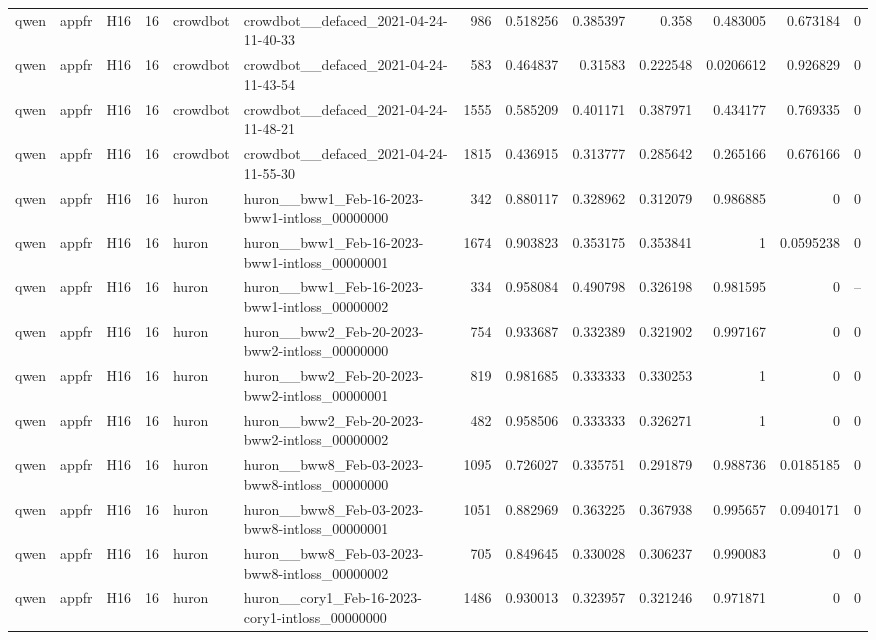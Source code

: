 \begin{longtable}{lllrllrrrrrrr}
qwen & appfr & H16 & 16 & crowdbot & crowdbot\_\_defaced\_2021-04-24-11-40-33 & 986 & 0.518256 & 0.385397 & 0.358 & 0.483005 & 0.673184 & 0 \\
qwen & appfr & H16 & 16 & crowdbot & crowdbot\_\_defaced\_2021-04-24-11-43-54 & 583 & 0.464837 & 0.31583 & 0.222548 & 0.0206612 & 0.926829 & 0 \\
qwen & appfr & H16 & 16 & crowdbot & crowdbot\_\_defaced\_2021-04-24-11-48-21 & 1555 & 0.585209 & 0.401171 & 0.387971 & 0.434177 & 0.769335 & 0 \\
qwen & appfr & H16 & 16 & crowdbot & crowdbot\_\_defaced\_2021-04-24-11-55-30 & 1815 & 0.436915 & 0.313777 & 0.285642 & 0.265166 & 0.676166 & 0 \\
qwen & appfr & H16 & 16 & huron & huron\_\_bww1\_Feb-16-2023-bww1-intloss\_00000000 & 342 & 0.880117 & 0.328962 & 0.312079 & 0.986885 & 0 & 0 \\
qwen & appfr & H16 & 16 & huron & huron\_\_bww1\_Feb-16-2023-bww1-intloss\_00000001 & 1674 & 0.903823 & 0.353175 & 0.353841 & 1 & 0.0595238 & 0 \\
qwen & appfr & H16 & 16 & huron & huron\_\_bww1\_Feb-16-2023-bww1-intloss\_00000002 & 334 & 0.958084 & 0.490798 & 0.326198 & 0.981595 & 0 & -- \\
qwen & appfr & H16 & 16 & huron & huron\_\_bww2\_Feb-20-2023-bww2-intloss\_00000000 & 754 & 0.933687 & 0.332389 & 0.321902 & 0.997167 & 0 & 0 \\
qwen & appfr & H16 & 16 & huron & huron\_\_bww2\_Feb-20-2023-bww2-intloss\_00000001 & 819 & 0.981685 & 0.333333 & 0.330253 & 1 & 0 & 0 \\
qwen & appfr & H16 & 16 & huron & huron\_\_bww2\_Feb-20-2023-bww2-intloss\_00000002 & 482 & 0.958506 & 0.333333 & 0.326271 & 1 & 0 & 0 \\
qwen & appfr & H16 & 16 & huron & huron\_\_bww8\_Feb-03-2023-bww8-intloss\_00000000 & 1095 & 0.726027 & 0.335751 & 0.291879 & 0.988736 & 0.0185185 & 0 \\
qwen & appfr & H16 & 16 & huron & huron\_\_bww8\_Feb-03-2023-bww8-intloss\_00000001 & 1051 & 0.882969 & 0.363225 & 0.367938 & 0.995657 & 0.0940171 & 0 \\
qwen & appfr & H16 & 16 & huron & huron\_\_bww8\_Feb-03-2023-bww8-intloss\_00000002 & 705 & 0.849645 & 0.330028 & 0.306237 & 0.990083 & 0 & 0 \\
qwen & appfr & H16 & 16 & huron & huron\_\_cory1\_Feb-16-2023-cory1-intloss\_00000000 & 1486 & 0.930013 & 0.323957 & 0.321246 & 0.971871 & 0 & 0 \\

\end{longtable}

